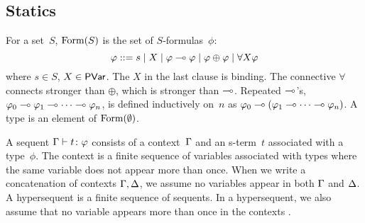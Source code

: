 

\subsection{Statics}
For a set~$S$,
$\mathop{\text{Form}}(S)$ is the set of $S$-formulas~$\phi$:
\[
\varphi::= s \mid X \mid \varphi\multimap\varphi\mid \varphi\oplus\varphi\mid
\forall X \varphi
\]
where $s\in S$, $X\in \mathsf{PVar}$. The $X$ in the
last clause is binding.
The connective $\forall$ connects stronger than $\oplus$, which is
stronger than $\multimap$.
Repeated $\multimap$'s,
$\varphi_0\multimap\varphi_1\multimap\cdots\multimap\varphi_n$, is defined inductively on~$n$
as
$\varphi_0\multimap(\varphi_1\multimap\cdots\multimap\varphi_n)$.
A type is an element of $\mathop{\text{Form}}(\emptyset)$.

A sequent ${\Gamma}\vdash{ {t} \colon{\varphi} }$ consists of a
context~$\Gamma$ and an s-term~$t$ associated with a type~$\phi$.
The context is a finite sequence of variables associated
with types where the same variable does not appear more than once.
When we write a concatenation of contexts $\Gamma,\Delta$, we assume no variables
appear in both $\Gamma$ and $\Delta$.
A hypersequent is a finite sequence of sequents.
In a hypersequent, we also assume that no variable appears more than once in
the contexts%
.

